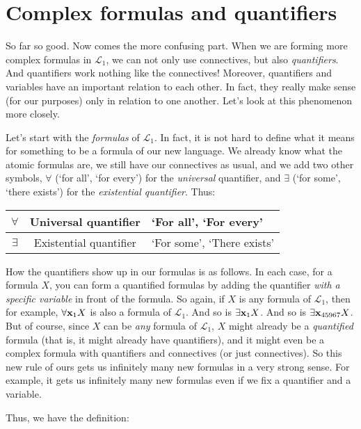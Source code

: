 \section{Complex formulas and quantifiers}

So far so good. Now comes the more confusing part. When we are forming more complex formulas in $\mathcal{L}_1$, we can not only use connectives, but also \textit{quantifiers}. And quantifiers work nothing like the connectives! Moreover, quantifiers and variables have an important relation to each other. In fact, they really make sense (for our purposes) only in relation to one another. Let's look at this phenomenon more closely.  

Let's start with the \textit{formulas} of $\mathcal{L}_1$. In fact, it is not hard to define what it means for something to be a formula of our new language. We already know what the atomic formulas are, we still have our connectives as usual, and we add two other symbols, $\forall$ (`for all', `for every') for the \textit{universal} quantifier, and $\exists$ (`for some', `there exists') for the \textit{existential quantifier}. Thus:

\begin{center}
	\begin{tabular}{c|c|l}
		$\forall$ & Universal quantifier &`For all', `For every'\\\hline
		$\exists$ & Existential quantifier & `For some', `There exists'  
	\end{tabular}
\end{center}

How the quantifiers show up in our formulas is as follows. In each case, for a formula $X$, you can form a quantified formulas by adding the quantifier \textit{with a specific variable} in front of the formula. So again, if $X$ is any formula of $\mathcal{L}_1$, then for example, $\forall \mathbf{x}_{1} X$ is also a formula of $\mathcal{L}_1$. And so is $\exists \mathbf{x}_{1} X$. And so is $\exists \mathbf{x}_{45967} X$. But of course, since $X$ can be \textit{any} formula of $\mathcal{L}_1$, $X$ might already be a \textit{quantified} formula (that is, it might already have quantifiers), and it might even be a complex formula with quantifiers and connectives (or just connectives). So this new rule of ours gets us infinitely many new formulas in a very strong sense. For example, it gets us infinitely many new formulas even if we fix a quantifier and a variable. 

Thus, we have the definition:

